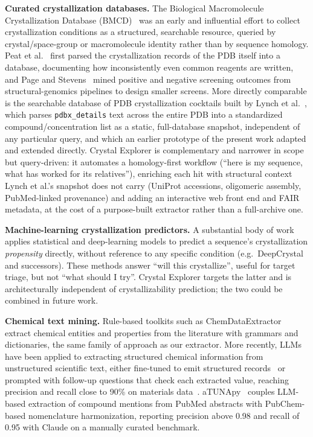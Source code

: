 \textbf{Curated crystallization databases.} The Biological Macromolecule
Crystallization Database (BMCD)~\cite{tung2009bmcd} was an early and
influential effort to collect crystallization conditions as a structured,
searchable resource, queried by crystal/space-group or macromolecule
identity rather than by sequence homology. Peat et al.~\cite{peat2005tapping}
first parsed the crystallization records of the PDB itself into a
database, documenting how inconsistently even common reagents are
written, and Page and Stevens~\cite{page2004mining} mined positive and
negative screening outcomes from structural-genomics pipelines to design
smaller screens. More directly comparable is
the searchable database of PDB crystallization cocktails built by Lynch
et al.~\cite{lynch2020searchable}, which parses \texttt{pdbx\_details}
text across the entire PDB into a standardized compound/concentration
list as a static, full-database snapshot, independent of any particular
query, and which an earlier prototype of the present work adapted and
extended directly. Crystal Explorer is complementary and narrower in
scope but query-driven: it automates a homology-first workflow (``here is
my sequence, what has worked for its relatives''), enriching each hit
with structural context Lynch et al.'s snapshot does not carry (UniProt
accessions, oligomeric assembly, PubMed-linked provenance) and adding an
interactive web front end and FAIR metadata, at the cost of a
purpose-built extractor rather than a full-archive one.

\textbf{Machine-learning crystallization predictors.} A substantial body
of work applies statistical and deep-learning models to predict a
sequence's crystallization \emph{propensity} directly, without reference
to any specific condition (e.g.\ DeepCrystal~\cite{elbasir2019deepcrystal}
and successors). These methods answer ``will this crystallize'', useful
for target triage, but not ``what should I try''. Crystal Explorer
targets the latter and is architecturally independent of
crystallizability prediction; the two could be combined in future work.

\textbf{Chemical text mining.} Rule-based toolkits such as
ChemDataExtractor~\cite{swain2016chemdataextractor} extract chemical
entities and properties from the literature with grammars and
dictionaries, the same family of approach as our extractor. More
recently, LLMs have been applied to extracting structured chemical
information from unstructured scientific text, either fine-tuned to
emit structured records~\cite{dagdelen2024structured} or prompted with
follow-up questions that check each extracted value, reaching precision
and recall close to 90\% on materials data~\cite{polak2024chatextract}.
aTUNApy~\cite{delmoralmorales2026atunapy}
couples LLM-based extraction of compound mentions from PubMed abstracts
with PubChem-based nomenclature harmonization, reporting precision above
0.98 and recall of 0.95 with Claude on a manually curated benchmark.


